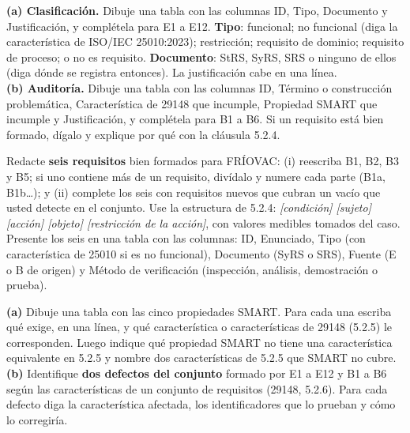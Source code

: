 \documentclass[11pt]{article}
\begin{document}
\begin{cajatarea}[title={T2. Clasificación y auditoría \hfill D2 · 30\,\%}]
	\textbf{(a) Clasificación.} Dibuje una tabla con las columnas ID, Tipo, Documento y Justificación, y complétela para E1 a E12. \textbf{Tipo}: funcional; no funcional (diga la característica de ISO/IEC 25010:2023); restricción; requisito de dominio; requisito de proceso; o no es requisito. \textbf{Documento}: StRS, SyRS, SRS o ninguno de ellos (diga dónde se registra entonces). La justificación cabe en una línea.\\[4pt]
	\textbf{(b) Auditoría.} Dibuje una tabla con las columnas ID, Término o construcción problemática, Característica de 29148 que incumple, Propiedad SMART que incumple y Justificación, y complétela para B1 a B6. Si un requisito está bien formado, dígalo y explique por qué con la cláusula 5.2.4.
\end{cajatarea}

\begin{cajatarea}[title={T3. Redacción de requisitos bien formados \hfill D3 · 30\,\%}]
	Redacte \textbf{seis requisitos} bien formados para FRÍOVAC: (i) reescriba B1, B2, B3 y B5; si uno contiene más de un requisito, divídalo y numere cada parte (B1a, B1b\ldots); y (ii) complete los seis con requisitos nuevos que cubran un vacío que usted detecte en el conjunto. Use la estructura de 5.2.4: \emph{[condición] [sujeto] [acción] [objeto] [restricción de la acción]}, con valores medibles tomados del caso.\\[4pt]
	Presente los seis en una tabla con las columnas: ID, Enunciado, Tipo (con característica de 25010 si es no funcional), Documento (SyRS o SRS), Fuente (E o B de origen) y Método de verificación (inspección, análisis, demostración o prueba).
\end{cajatarea}

\begin{cajatarea}[title={T4. Sustento normativo de la calidad \hfill D4 · 20\,\% (junto con las citas de T1 a T3)}]
	\textbf{(a)} Dibuje una tabla con las cinco propiedades SMART. Para cada una escriba qué exige, en una línea, y qué característica o características de 29148 (5.2.5) le corresponden. Luego indique qué propiedad SMART no tiene una característica equivalente en 5.2.5 y nombre dos características de 5.2.5 que SMART no cubre.\\[4pt]
	\textbf{(b)} Identifique \textbf{dos defectos del conjunto} formado por E1 a E12 y B1 a B6 según las características de un conjunto de requisitos (29148, 5.2.6). Para cada defecto diga la característica afectada, los identificadores que lo prueban y cómo lo corregiría.
\end{cajatarea}
\end{document}
